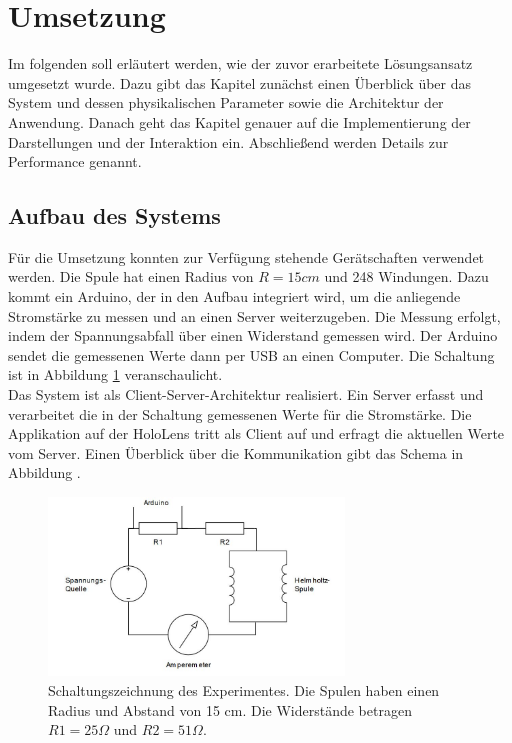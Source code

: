 \section{Umsetzung}
\label{sec-5}

Im folgenden soll erläutert werden, wie der zuvor erarbeitete Lösungsansatz umgesetzt wurde. Dazu gibt das Kapitel zunächst einen Überblick über das System und dessen physikalischen Parameter sowie die Architektur der Anwendung. Danach geht das Kapitel genauer auf die Implementierung der Darstellungen und der Interaktion ein. Abschließend werden Details zur Performance genannt.

\subsection{Aufbau des Systems}
\label{sec-5-1}
Für die Umsetzung konnten zur Verfügung stehende Gerätschaften verwendet werden. Die Spule hat einen Radius von $R = 15 cm$ und 248 Windungen. Dazu kommt ein Arduino, der in den Aufbau integriert wird, um die anliegende Stromstärke zu messen und an einen Server weiterzugeben. Die Messung erfolgt, indem der Spannungsabfall über einen Widerstand gemessen wird. Der Arduino sendet die gemessenen Werte dann per USB an einen Computer. Die Schaltung ist in Abbildung \ref{img:schaltung} veranschaulicht. \\

Das System ist als Client-Server-Architektur realisiert. Ein Server erfasst und verarbeitet die in der Schaltung gemessenen Werte für die Stromstärke. Die Applikation auf der HoloLens tritt als Client auf und erfragt die aktuellen Werte vom Server. Einen Überblick über die Kommunikation gibt das Schema in Abbildung . 
\begin{figure}[H]
	\centering
	\includegraphics[width=0.7\textwidth]{images/schema/schaltung.jpg}
	\caption{Schaltungszeichnung des Experimentes. Die Spulen haben einen Radius und Abstand von 15 cm. Die Widerstände betragen $R1 = 25 \Omega$ und $R2 = 51 \Omega$.}
	\label{img:schaltung}
\end{figure}

